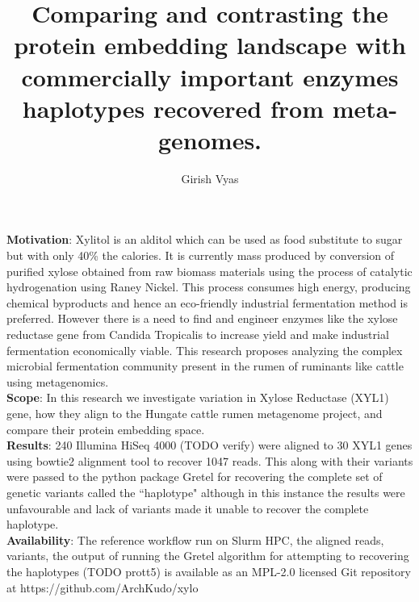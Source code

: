 \documentclass{main}
\title{Comparing and contrasting the protein embedding landscape with commercially important enzymes haplotypes recovered from meta-genomes.}    %
\author{Girish Vyas}                      %
\begin{document}
\setlength{\parindent}{0pt}

\onehalfspacing

\begin{singlespace}

  \beforepreface







  \textbf{Motivation}: Xylitol is an alditol which can be used as food substitute to sugar but with only 40\% the calories. It is currently mass produced by conversion of purified xylose obtained from raw biomass materials using the process of catalytic hydrogenation using Raney Nickel. This process consumes high energy, producing chemical byproducts and hence an eco-friendly industrial fermentation method is preferred. However there is a need to find and engineer enzymes like the xylose reductase gene from Candida Tropicalis to increase yield and make industrial fermentation economically viable. This research proposes analyzing the complex microbial fermentation community present in the rumen of ruminants like cattle using metagenomics.\\
  \textbf{Scope}: In this research we investigate variation in Xylose Reductase (XYL1) gene, how they align to the Hungate cattle rumen metagenome project, and compare their protein embedding space.\\
  \textbf{Results}: 240 Illumina HiSeq 4000 (TODO verify) were aligned to 30 XYL1 genes using bowtie2 alignment tool to recover 1047 reads. This along with their variants were passed to the python package Gretel for recovering the complete set of genetic variants called the ``haplotype" although in this instance the results were unfavourable and lack of variants made it unable to recover the complete haplotype.\\
  \textbf{Availability}: The reference workflow run on Slurm HPC, the aligned reads, variants, the output of running the Gretel algorithm for attempting to recovering the haplotypes (TODO prott5) is available as an MPL-2.0 licensed Git repository at https://github.com/ArchKudo/xylo





\end{singlespace}
\end{document}
